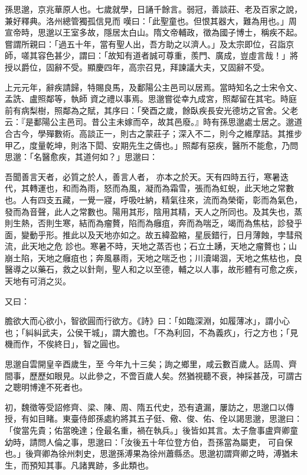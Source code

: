 \begin{pinyinscope}
 孫思邈，京兆華原人也。七歲就學，日誦千餘言。弱冠，善談莊、老及百家之說，兼好釋典。洛州總管獨孤信見而
 嘆曰：「此聖童也。但恨其器大，難為用也。」周宣帝時，思邈以王室多故，隱居太白山。隋文帝輔政，徵為國子博士，稱疾不起。嘗謂所親曰：「過五十年，當有聖人出，吾方助之以濟人。」及太宗即位，召詣京師，嗟其容色甚少，謂曰：「故知有道者誠可尊重，羨門、廣成，豈虛言哉！」將授以爵位，固辭不受。顯慶四年，高宗召見，拜諫議大夫，又固辭不受。



 上元元年，辭疾請歸，特賜良馬，及鄱陽公主邑司以居焉。當時知名之士宋令文、孟詵、盧照鄰等，執師
 資之禮以事焉。思邈嘗從幸九成宮，照鄰留在其宅。時庭前有病梨樹，照鄰為之賦，其序曰：「癸酉之歲，餘臥疾長安光德坊之官舍。父老云：『是鄱陽公主邑司。昔公主未嫁而卒，故其邑廢。』時有孫思邈處士居之。邈道合古今，學殫數術。高談正一，則古之蒙莊子；深入不二，則今之維摩詰。其推步甲乙，度量乾坤，則洛下閎、安期先生之儔也。」照鄰有惡疾，醫所不能愈，乃問思邈：「名醫愈疾，其道何如？」思邈曰：



 吾聞善言天者，必質之於人，善言人者，
 亦本之於天。天有四時五行，寒暑迭代，其轉運也，和而為雨，怒而為風，凝而為霜雪，張而為虹蜺，此天地之常數也。人有四支五藏，一覺一寢，呼吸吐納，精氣往來，流而為榮衛，彰而為氣色，發而為音聲，此人之常數也。陽用其形，陰用其精，天人之所同也。及其失也，蒸則生熱，否則生寒，結而為瘤贅，陷而為癰疽，奔而為喘乏，竭而為焦枯，診發乎面，變動乎形。推此以及天地亦如之。故五緯盈縮，星辰錯行，日月薄蝕，孛彗飛流，此天地之危
 診也。寒暑不時，天地之蒸否也；石立土踴，天地之瘤贅也；山崩土陷，天地之癰疽也；奔風暴雨，天地之喘乏也；川瀆竭涸，天地之焦枯也，良醫導之以藥石，救之以針劑，聖人和之以至德，輔之以人事，故形體有可愈之疾，天地有可消之災。



 又曰：



 膽欲大而心欲小，智欲圓而行欲方。《詩》曰：「如臨深淵，如履薄冰」，謂小心也；「糾糾武夫，公侯干城」，謂大膽也。「不為利回，不為義疚」，行之方也；「見機而作，不俟終日」，智之圓也。



 思邈自雲開皇辛酉歲生，至
 今年九十三矣；詢之鄉里，咸云數百歲人。話周、齊間事，歷歷如眼見。以此參之，不啻百歲人矣。然猶視聽不衰，神採甚茂，可謂古之聰明博達不死者也。



 初，魏徵等受詔修齊、梁、陳、周、隋五代史，恐有遺漏，屢訪之，思邈口以傳授，有如目睹。東臺侍郎孫處約將其五子侹、儆、俊、佑、佺以謁思邈，思邈曰：「俊當先貴；佑當晚達；佺最名重，禍在執兵。」後皆如其言。太子詹事盧齊卿童幼時，請問人倫之事，思邈曰：「汝後五十年位登方伯，吾孫當為屬吏，
 可自保也。」後齊卿為徐州刺史，思邈孫溥果為徐州蕭縣丞。思邈初謂齊卿之時，溥猶未生，而預知其事。凡諸異跡，多此類也。




\end{pinyinscope}
